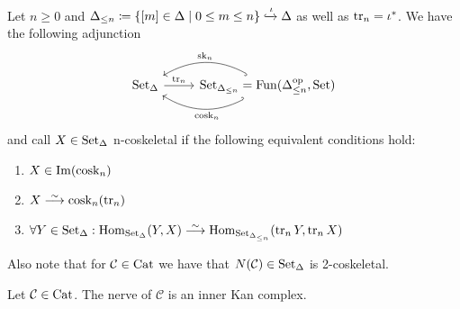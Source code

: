 \begin{rmk}
    Let $n \geq 0$ and 
    $\Delta_{\leq n} \coloneqq \{ [m] \in \Delta \mid 0 \leq m \leq n\}\xhookrightarrow{\iota} \Delta$ as well as $\operatorname{tr}_n = \iota^*$. 
    We have the following adjunction
    \[
    \begin{tikzcd}
        \SetD
        &
        \Set_{\Delta_{\leq n}}= \Fun(\Delta^{\op}_{\leq n} , \Set)
        \arrow[from=1-1, to=1-2, "\tru_n"]
        \arrow[from=1-2, to=1-1, bend left, hook', "\cosk_n" pos=0.45]
        \arrow[from=1-2, to=1-1, bend right, hook,"\sk_n"']
    \end{tikzcd}
    \]
    and call $X \in \operatorname{Set}_{\Delta}$ n-coskeletal if the following equivalent conditions hold:
    \begin{enumerate}
        \item 
        $X \in \operatorname{Im}(\operatorname{cosk}_n)$
        \item 
        $X \isomorphism \cosk_n(\tru_n)$
        \item 
        $\forall Y \in \SetD: \Hom_{\SetD}(Y,X) \isomorphism \Hom_{\Set_{\Delta_{\leq n}}}(\tru_n Y, \tru_n X)$
    \end{enumerate}
    Also note that for $\mathcal{C} \in \operatorname{Cat}$ we have that $N(\mathcal{C)} \in \operatorname{Set}_{\Delta}$ is 2-coskeletal.
\end{rmk}

\begin{prop}
    Let $\mathcal{C} \in \operatorname{Cat}$. The nerve of $\mathcal{C}$ is an inner Kan complex.
\end{prop}

